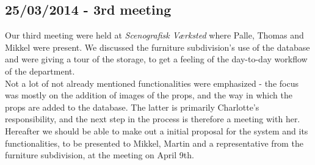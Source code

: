 \documentclass[12pt]{article}
\begin{document}
\subsection*{25/03/2014 - 3rd meeting}
Our third meeting were held at \textit{Scenografisk Værksted} where Palle, Thomas and Mikkel were present. We discussed the furniture subdivision's use of the database and were giving a tour of the storage, to get a feeling of the day-to-day workflow of the department. \\
Not a lot of not already mentioned functionalities were emphasized - the focus was mostly on the addition of images of the props, and the way in which the props are added to the database. The latter is primarily Charlotte's responsibility, and the next step in the process is therefore a meeting with her. Hereafter we should be able to make out a initial proposal for the system and its functionalities, to be presented to Mikkel, Martin and a representative from the furniture subdivision, at the meeting on April 9th.  
\end{document}
